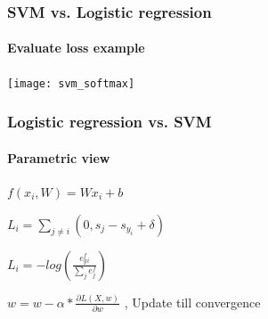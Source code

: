 \documentclass{beamer}
\begin{document}
\begin{frame}
	\frametitle{SVM vs. Logistic regression}
	\framesubtitle{Evaluate loss example}
	\begin{center}
		\texttt{[image: svm\_softmax]}
	\end{center}
	
\end{frame}

\iffalse
\begin{frame}
	\frametitle{Logistic regression vs. SVM}
	\framesubtitle{Parametric view}
	\begin{definition}
		$ f(x_i,W) = Wx_i + b $
	\end{definition}
	
	\begin{definition}
		$ L_i = \sum_{j \neq i}(0,s_j-s_y_i + \delta)$
	\end{definition}
	
	\begin{definition}
		$ L_i = -log(\frac{e^f_y_i}{\sum_{j}e^f_j})$
	\end{definition}

	\begin{definition}
		\centering
		$w = w - \alpha * \frac{\partial L(X,w)}{\partial w} $ , Update till convergence
	\end{definition}

\end{frame}
\end{document}
